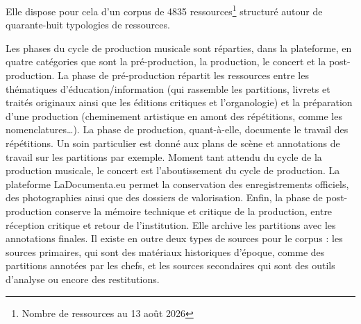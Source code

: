 Elle dispose pour cela d'un corpus de 4835 ressources\footnote{Nombre de ressources au 13 août 2026} structuré autour de quarante-huit typologies de ressources.

Les phases du cycle de production musicale sont réparties, dans la plateforme, en quatre catégories que sont la pré-production, la production, le concert et la post-production.
La phase de pré-production répartit les ressources entre les thématiques d’éducation/information (qui rassemble les partitions, livrets et traités originaux ainsi que les éditions critiques et l’organologie) et la préparation d’une production (cheminement artistique en amont des répétitions, comme les nomenclatures…).
La phase de production, quant-à-elle, documente le travail des répétitions. Un soin particulier est donné aux plans de scène et annotations de travail sur les partitions par exemple.
Moment tant attendu du cycle de la production musicale, le concert est l’aboutissement du cycle de production. La plateforme LaDocumenta.eu permet la conservation des enregistrements officiels, des photographies ainsi que des dossiers de valorisation. 
Enfin, la phase de post-production conserve la mémoire technique et critique de la production, entre réception critique et retour de l’institution. Elle archive les partitions avec les annotations finales. Il existe en outre deux types de sources pour le corpus : les sources primaires, qui sont des matériaux historiques d’époque, comme des partitions annotées par les chefs, et les sources secondaires qui sont des outils d’analyse ou encore des restitutions. 




